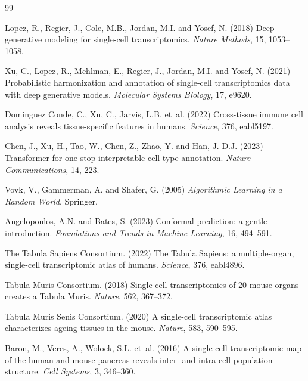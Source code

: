 \documentclass[11pt]{article}
\begin{document}
\begin{thebibliography}{99}

Lopez, R., Regier, J., Cole, M.B., Jordan, M.I. and Yosef, N. (2018)
Deep generative modeling for single-cell transcriptomics.
\emph{Nature Methods}, 15, 1053--1058.

Xu, C., Lopez, R., Mehlman, E., Regier, J., Jordan, M.I. and Yosef, N. (2021)
Probabilistic harmonization and annotation of single-cell transcriptomics data
with deep generative models. \emph{Molecular Systems Biology}, 17, e9620.

Dominguez Conde, C., Xu, C., Jarvis, L.B. et~al. (2022)
Cross-tissue immune cell analysis reveals tissue-specific features in humans.
\emph{Science}, 376, eabl5197.

Chen, J., Xu, H., Tao, W., Chen, Z., Zhao, Y. and Han, J.-D.J. (2023)
Transformer for one stop interpretable cell type annotation.
\emph{Nature Communications}, 14, 223.

Vovk, V., Gammerman, A. and Shafer, G. (2005)
\emph{Algorithmic Learning in a Random World}. Springer.

Angelopoulos, A.N. and Bates, S. (2023)
Conformal prediction: a gentle introduction.
\emph{Foundations and Trends in Machine Learning}, 16, 494--591.

The Tabula Sapiens Consortium. (2022)
The Tabula Sapiens: a multiple-organ, single-cell transcriptomic atlas of
humans. \emph{Science}, 376, eabl4896.

Tabula Muris Consortium. (2018)
Single-cell transcriptomics of 20 mouse organs creates a Tabula Muris.
\emph{Nature}, 562, 367--372.

Tabula Muris Senis Consortium. (2020)
A single-cell transcriptomic atlas characterizes ageing tissues in the mouse.
\emph{Nature}, 583, 590--595.

Baron, M., Veres, A., Wolock, S.L. et~al. (2016)
A single-cell transcriptomic map of the human and mouse pancreas reveals
inter- and intra-cell population structure. \emph{Cell Systems}, 3, 346--360.

\end{thebibliography}
\end{document}
